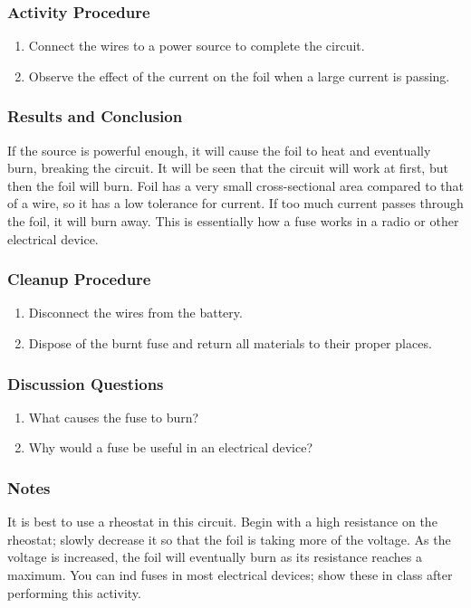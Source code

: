 \subsubsection*{Activity Procedure}
\begin{enumerate}
\item{Connect the wires to a power source to complete the circuit.}
\item{Observe the effect of the current on the foil when a large current is passing.}
\end{enumerate}

\subsubsection*{Results and Conclusion}
If the source is powerful enough, it will cause the foil to heat and eventually burn, breaking the circuit.  It will be seen that the circuit will work at first, but then the foil will burn.  Foil has a very small cross-sectional area compared to that of a wire, so it has a low tolerance for current. If too much current passes through the foil, it will burn away. This is essentially how a fuse works in a radio or other electrical device.

\subsubsection*{Cleanup Procedure}
\begin{enumerate}
\item{Disconnect the wires from the battery.}
\item{Dispose of the burnt fuse and return all materials to their proper places.}
\end{enumerate}

\subsubsection*{Discussion Questions}
\begin{enumerate}
\item{What causes the fuse to burn?}
\item{Why would a fuse be useful in an electrical device?}
\end{enumerate}

\subsubsection*{Notes}
It is best to use a rheostat in this circuit.  Begin with a high resistance on the rheostat; slowly decrease it so that the foil is taking more of the voltage.  As the voltage is increased, the foil will eventually burn as its resistance reaches a maximum.
You can ind fuses in most electrical devices; show these in class after performing this activity.


